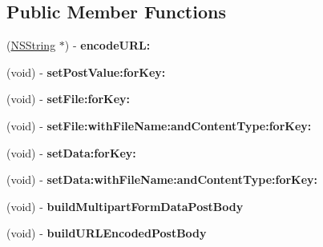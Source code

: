 \subsection*{Public Member Functions}
\begin{DoxyCompactItemize}
\item 
\hypertarget{interface_a_s_i_form_data_request_a817cf8f9da80c83539be0f3c9b8dc868}{
(\hyperlink{class_n_s_string}{NSString} $\ast$) -\/ {\bfseries encodeURL:}}
\label{interface_a_s_i_form_data_request_a817cf8f9da80c83539be0f3c9b8dc868}

\item 
\hypertarget{interface_a_s_i_form_data_request_a90236e7099afbab72bb160029df5a368}{
(void) -\/ {\bfseries setPostValue:forKey:}}
\label{interface_a_s_i_form_data_request_a90236e7099afbab72bb160029df5a368}

\item 
\hypertarget{interface_a_s_i_form_data_request_a8b097474a664290880231fd4439f352e}{
(void) -\/ {\bfseries setFile:forKey:}}
\label{interface_a_s_i_form_data_request_a8b097474a664290880231fd4439f352e}

\item 
\hypertarget{interface_a_s_i_form_data_request_a6367b10ba636657b8a08725ec17e879d}{
(void) -\/ {\bfseries setFile:withFileName:andContentType:forKey:}}
\label{interface_a_s_i_form_data_request_a6367b10ba636657b8a08725ec17e879d}

\item 
\hypertarget{interface_a_s_i_form_data_request_a707a5cef615835146cdbed3ceca31016}{
(void) -\/ {\bfseries setData:forKey:}}
\label{interface_a_s_i_form_data_request_a707a5cef615835146cdbed3ceca31016}

\item 
\hypertarget{interface_a_s_i_form_data_request_abbcca0f83bbe93f0132094a99a274098}{
(void) -\/ {\bfseries setData:withFileName:andContentType:forKey:}}
\label{interface_a_s_i_form_data_request_abbcca0f83bbe93f0132094a99a274098}

\item 
\hypertarget{interface_a_s_i_form_data_request_a55154abc422c9c4497599337ebc1c932}{
(void) -\/ {\bfseries buildMultipartFormDataPostBody}}
\label{interface_a_s_i_form_data_request_a55154abc422c9c4497599337ebc1c932}

\item 
\hypertarget{interface_a_s_i_form_data_request_a2927a87a8bfc64e29f5df6f0ea4792b7}{
(void) -\/ {\bfseries buildURLEncodedPostBody}}
\label{interface_a_s_i_form_data_request_a2927a87a8bfc64e29f5df6f0ea4792b7}

\end{DoxyCompactItemize}
